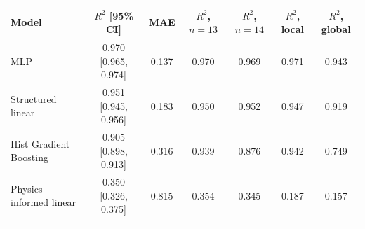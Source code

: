 \begin{tabular}{lcccccc}
\toprule
Model & $R^2$ [95\% CI] & MAE & $R^2$, $n=13$ & $R^2$, $n=14$ & $R^2$, local & $R^2$, global \\
\midrule
MLP & 0.970 [0.965, 0.974] & 0.137 & 0.970 & 0.969 & 0.971 & 0.943 \\
Structured linear & 0.951 [0.945, 0.956] & 0.183 & 0.950 & 0.952 & 0.947 & 0.919 \\
Hist Gradient Boosting & 0.905 [0.898, 0.913] & 0.316 & 0.939 & 0.876 & 0.942 & 0.749 \\
Physics-informed linear & 0.350 [0.326, 0.375] & 0.815 & 0.354 & 0.345 & 0.187 & 0.157 \\
\botrule
\end{tabular}
